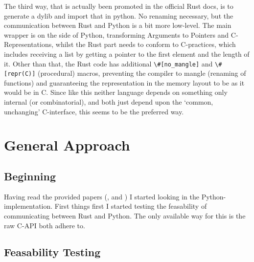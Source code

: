 The third way, that is actually been promoted in the official Rust docs, is to
generate a dylib and import that in python. No renaming necessary, but the
communication between Rust and Python is a bit more low-level. The main wrapper
is on the side of Python, transforming Arguments to Pointers and
C-Representations, whilst the Rust part needs to conform to C-practices, which
includes receiving a list by getting a pointer to the first element and the
length of it. Other than that, the Rust code has additional
\verb!\#[no_mangle]! and \verb!\#[repr(C)]!  (procedural) macros, preventing
the compiler to mangle (renaming of functions) and guaranteeing the
representation in the memory layout to be as it would be in C. Since like this
neither language depends on something only internal (or combinatorial), and
both just depend upon the ‘common, unchanging’ C-interface, this seems to be
the preferred way.


\newpage
\section{General Approach}\label{sec:approach}




\subsection{Beginning}


Having read the provided papers (\cite{imakaev2012iterative},
\cite{lieberman2009comprehensive} and \cite{wingett2015hicup}) I started
looking in the Python-implementation. First things first I started testing the
feasability of communicating between Rust and Python. The only available way
for this is the raw C-API both adhere to.

\subsection{Feasability Testing}


